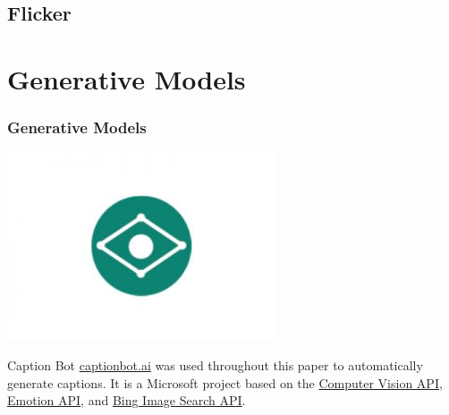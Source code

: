 \documentclass[xcolor=dvipsnames]{beamer}
\begin{document}
			\begin{frame}
				\frametitle{}
				
			\end{frame}
		
		\subsection{Flicker}
			
			\begin{frame}
				\frametitle{}
				
			\end{frame}
	
	\section{Generative Models}
		
		\begin{frame}
			\frametitle{Generative Models}
			\begin{center}
				\includegraphics[scale=.3]{images/captionbot.jpg}
			\end{center}
			\begin{block}{Caption Bot \cite{fang2015captions}}
				\href{https://www.captionbot.ai/}{captionbot.ai} was used throughout this paper to automatically generate captions. It is a Microsoft project based on the \href{https://azure.microsoft.com/en-us/services/cognitive-services/computer-vision/}{Computer Vision API}, \href{https://azure.microsoft.com/en-us/services/cognitive-services/emotion/}{Emotion API}, and \href{https://azure.microsoft.com/en-us/services/cognitive-services/bing-image-search-api/}{Bing Image Search API}.
			\end{block}
		\end{frame}
	
\end{document}
